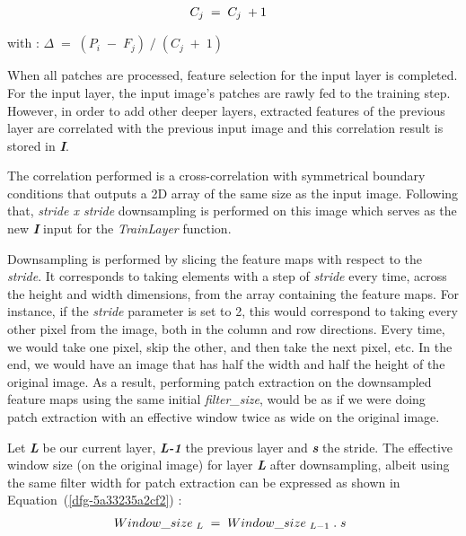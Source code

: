 \documentclass[3p,,preprint,review,12pt]{elsarticle}
\begin{document}
\let\saveeqnno\theequation
\let\savefrac\frac
\def\dispfrac{\displaystyle\savefrac}
\begin{eqnarray}
\let\frac\dispfrac
\gdef\theequation{7}
\let\theHequation\theequation
\label{dfg-f81ca8d8cde3}
\begin{array}{@{}l}C_j\;=\;C_j\;+1\;\end{array}
\end{eqnarray}
\global\let\theequation\saveeqnno
\addtocounter{equation}{-1}\ignorespaces 
with : $\Delta\;=\;(P_i\;-\;F_j)\;/\;(C_j\;+\;1)\; $

When all patches are processed, feature selection for the input layer is completed. For the input layer, the input image's patches are rawly fed to the training step. However, in order to add other deeper layers, extracted features of the previous layer are correlated with the previous input image and this correlation result is stored in \textbf{\textit{I}}.

The correlation performed is a cross-correlation with symmetrical boundary conditions that outputs a 2D array of the same size as the input image. Following that, \textit{stride x stride} downsampling is performed on this image which serves as the new \textbf{\textit{I}} input for the \textit{TrainLayer }function. 

Downsampling is performed by slicing the feature maps with respect to the \textit{stride}. It corresponds to taking elements with a step of \textit{stride} every time, across the height and width dimensions, from the array containing the feature maps. For instance, if the \textit{stride} parameter is set to 2, this would correspond to taking every other pixel from the image, both in the column and row directions. Every time, we would take one pixel, skip the other, and then take the next pixel, etc. In the end, we would have an image that has half the width and half the height of the original image.
As a result, performing patch extraction on the downsampled feature maps using the same initial  \textit{filter\_size},   would be as if we were doing patch extraction with an effective window twice as wide on the original image.

Let \textbf{\textit{L}} be our current layer, \textbf{\textit{L-1}} the previous layer and \textbf{\textit{s}} the stride. The effective window size (on the original image) for layer \textbf{\textit{L}} after downsampling, albeit using the same filter width for patch extraction can be expressed as shown in Equation~(\ref{dfg-5a33235a2cf2}) : 
\let\saveeqnno\theequation
\let\savefrac\frac
\def\dispfrac{\displaystyle\savefrac}
\begin{eqnarray}
\let\frac\dispfrac
\gdef\theequation{4}
\let\theHequation\theequation
\label{dfg-5a33235a2cf2}
\begin{array}{@{}l}Window\_size\;_L\;=\;Window\_size\;_{L-1}\;.\;s\end{array}
\end{eqnarray}
\global\let\theequation\saveeqnno
\addtocounter{equation}{-1}\ignorespaces 
\end{document}

